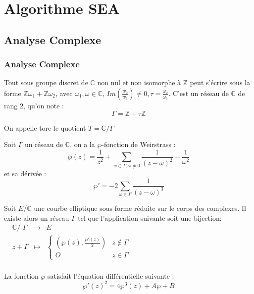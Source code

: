 \documentclass[french]{beamer}
\begin{document}
\section{Algorithme SEA}
\subsection{Analyse Complexe}
\begin{frame}
\frametitle{Analyse Complexe}
\begin{definition}
Tout sous groupe discret de $\mathbb{C}$ non nul et non isomorphe à $\mathbb{Z}$ peut s'écrire sous la forme $\mathbb{Z}\omega_1 + \mathbb{Z}\omega_2$, avec $\omega_1, \omega \in \mathbb{C}$, $Im(\frac{w_2}{w_1}) \ne 0, \tau = \frac{\omega_2}{\omega_1}$. C'est un réseau de $\mathbb{C}$ de rang $2$, qu'on note :
$$\Gamma = \mathbb{Z} + \tau \mathbb{Z}$$
\end{definition}

\begin{definition}
On appelle tore le quotient $T=\mathbb{C} / \Gamma$
\end{definition}
\end{frame}

\begin{frame}
Soit $\Gamma$ un réseau de $\mathbb{C}$, on a la $\wp$-fonction de Weirstrass :
$$ \wp(z) = \frac{1}{z^2} + \sum_{w \in \Gamma, \omega \ne 0} \frac{1}{(z-\omega)^2} - \frac{1}{\omega^2} $$
et sa dérivée : 
$$ {\wp'} = -2 \sum_{\omega \in \Gamma} \frac{1}{(z-\omega)^3} $$
\begin{theorem}
Soit $E$/$\mathbb{C}$ une courbe elliptique sous forme réduite sur le corps des complexes. Il existe alors un réseau $\Gamma$ tel que l'application suivante soit une bijection:
\newline
$\begin{array}{cccc}
& \mathbb{C}\text{/ }\Gamma & \to & E \\
& z + \Gamma & \mapsto & \left\lbrace
\begin{array}{cc}
 (\wp(z), \frac{{\wp'}(z)}{2})  & z \notin \Gamma \\
 O & z \in \Gamma
\end{array}\right.\\
\end{array}$
\end{theorem}
La fonction $\wp$ satisfait l'équation différentielle suivante : 
\begin{equation*}
{\wp'}(z)^2 = 4\wp^3(z) + A \wp + B
\end{equation*}
\end{frame}
\end{document}
